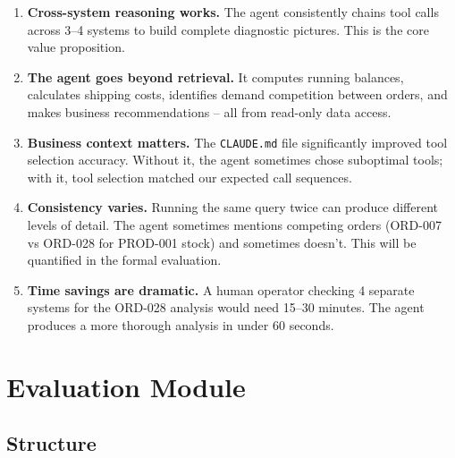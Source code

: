 \documentclass[11pt,a4paper]{article}
\begin{document}
\begin{enumerate}[itemsep=0.5em]
    \item \textbf{Cross-system reasoning works.} The agent consistently chains tool calls across 3--4 systems to build complete diagnostic pictures. This is the core value proposition.

    \item \textbf{The agent goes beyond retrieval.} It computes running balances, calculates shipping costs, identifies demand competition between orders, and makes business recommendations -- all from read-only data access.

    \item \textbf{Business context matters.} The \texttt{CLAUDE.md} file significantly improved tool selection accuracy. Without it, the agent sometimes chose suboptimal tools; with it, tool selection matched our expected call sequences.

    \item \textbf{Consistency varies.} Running the same query twice can produce different levels of detail. The agent sometimes mentions competing orders (ORD-007 vs ORD-028 for PROD-001 stock) and sometimes doesn't. This will be quantified in the formal evaluation.

    \item \textbf{Time savings are dramatic.} A human operator checking 4 separate systems for the ORD-028 analysis would need 15--30 minutes. The agent produces a more thorough analysis in under 60 seconds.
\end{enumerate}

\section{Evaluation Module}

\subsection{Structure}
\end{document}
